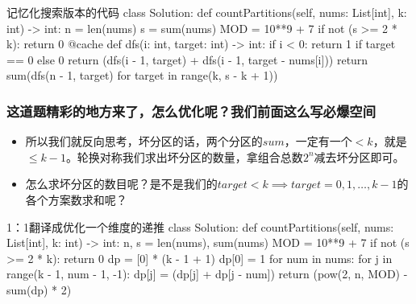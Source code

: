 \begin{frame}[fragile]          %
  
  \begin{codeblock}[language=python]{记忆化搜索版本的代码}
class Solution:
    def countPartitions(self, nums: List[int], k: int) -> int:
        n = len(nums)
        s = sum(nums)
        MOD = 10**9 + 7
        if not (s >= 2 * k):
            return 0
        @cache
        def dfs(i: int, target: int) -> int:
            if i < 0:
                return 1 if target == 0 else 0
            return (dfs(i - 1, target) + dfs(i - 1, target - nums[i])) %
        return sum(dfs(n - 1, target) for target in range(k, s - k + 1)) %
  \end{codeblock}
\end{frame}


\begin{frame}[fragile]          %
  \frametitle{这道题精彩的地方来了，怎么优化呢？我们前面这么写必爆空间}
  \begin{itemize}
  \item 所以我们就反向思考，坏分区的话，两个分区的$sum$，一定有一个$< k$，就是$\leq k-1$。轮换对称我们求出坏分区的数量，拿组合总数$2^n$减去坏分区即可。
  \item 怎么求坏分区的数目呢？是不是我们的$target<k\implies target=0,1,\dots,k-1$的各个方案数求和呢？
  \end{itemize}
\end{frame}


\begin{frame}[fragile]          %
  
  \begin{codeblock}[language=python]{1：1翻译成优化一个维度的递推}
class Solution:
    def countPartitions(self, nums: List[int], k: int) -> int:
        n, s = len(nums), sum(nums)
        MOD = 10**9 + 7
        if not (s >= 2 * k):
            return 0
        dp = [0] * (k - 1 + 1)
        dp[0] = 1
        for num in nums:
            for j in range(k - 1, num - 1, -1):
                dp[j] = (dp[j] + dp[j - num]) %
        return (pow(2, n, MOD) - sum(dp) * 2) %
  \end{codeblock}
\end{frame}

